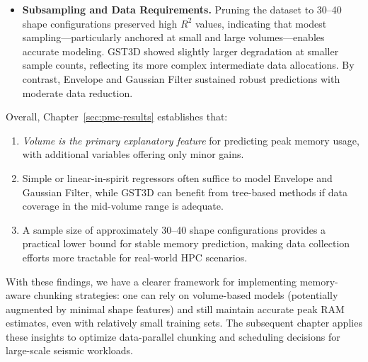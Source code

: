 \begin{itemize}
    \item \textbf{Subsampling and Data Requirements.}
    Pruning the dataset to 30–40 shape configurations preserved high $R^2$ values, indicating that modest sampling—particularly anchored at small and large volumes—enables accurate modeling.
    \ac{GST3D} showed slightly larger degradation at smaller sample counts, reflecting its more complex intermediate data allocations.
    By contrast, Envelope and Gaussian Filter sustained robust predictions with moderate data reduction.
\end{itemize}

Overall, Chapter~\ref{sec:pmc-results} establishes that:
\begin{enumerate}
    \item \emph{Volume is the primary explanatory feature} for predicting peak memory usage, with additional variables offering only minor gains.
    \item Simple or linear-in-spirit regressors often suffice to model Envelope and Gaussian Filter, while \ac{GST3D} can benefit from tree-based methods if data coverage in the mid-volume range is adequate.
    \item A sample size of approximately 30–40 shape configurations provides a practical lower bound for stable memory prediction, making data collection efforts more tractable for real-world \ac{HPC} scenarios.
\end{enumerate}

With these findings, we have a clearer framework for implementing memory-aware chunking strategies: one can rely on volume-based models (potentially augmented by minimal shape features) and still maintain accurate peak \ac{RAM}  estimates, even with relatively small training sets.
The subsequent chapter applies these insights to optimize data-parallel chunking and scheduling decisions for large-scale seismic workloads.